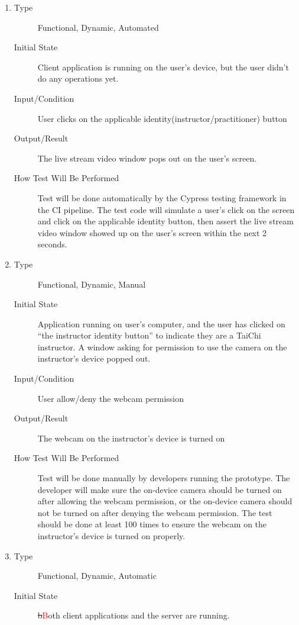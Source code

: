 \documentclass[12pt, titlepage]{article}
\newcommand{\rt}[1]{\textcolor{red}{#1}}
\begin{document}
\begin{enumerate}[FR-T1]
\item \label{FRT1}
  \begin{description}
  \item[Type] Functional, Dynamic, Automated
  \item[Initial State] Client application is running on the user's device, but the
    user didn’t do any operations yet.
  \item[Input/Condition] User clicks on the applicable
    identity(instructor/practitioner) button
  \item[Output/Result] The live stream video window pops out on the user's screen.
  \item[How Test Will Be Performed] Test will be done automatically by the Cypress
    testing framework in the CI pipeline. The test code will simulate a user's
    click on the screen and click on the applicable identity button, then assert
    the live stream video window showed up on the user's screen within the next
    2 seconds.
  \end{description}
\item \label{FRT2}
  \begin{description}
  \item[Type] Functional, Dynamic, Manual
  \item[Initial State] Application running on user’s computer, and the user has
    clicked on “the instructor identity button” to indicate they are a TaiChi
    instructor. A window asking for permission to use the camera on the
    instructor's device popped out.
  \item[Input/Condition] User allow/deny the webcam permission
  \item[Output/Result] The webcam on the instructor’s device is turned on
  \item[How Test Will Be Performed] Test will be done manually by developers
    running the prototype. The developer will make sure the on-device camera
    should be turned on after allowing the webcam permission, or the on-device
    camera should not be turned on after denying the webcam permission. The test
    should be done at least 100 times to ensure the webcam on the instructor’s
    device is turned on properly.
  \end{description}
\item \label{FRT3}
  \begin{description}
  \item[Type] Functional, Dynamic, Automatic
  \item[Initial State] \sout{b}\rt{B}oth client applications and the server are running.

\end{description}
\end{enumerate}
\end{document}
